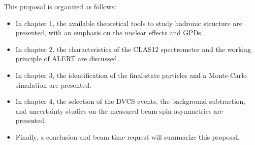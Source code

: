 This proposal is organized as follows:
\begin{itemize}
\item In chapter 1, the available theoretical tools to study hadronic structure 
   are presented, with an emphasis on the nuclear effects and GPDs.
\item In chapter 2, the characteristics of the CLAS12 spectrometer and the 
working principle of ALERT are discussed.
\item In chapter 3, the identification of the final-state particles and a 
Monte-Carlo simulation are presented.
\item In chapter 4, the selection of the DVCS events, the background 
subtraction, and uncertainty studies on the measured beam-spin asymmetries are 
presented.
\item Finally, a conclusion and beam time request will summarize this proposal.  
\end{itemize} 



